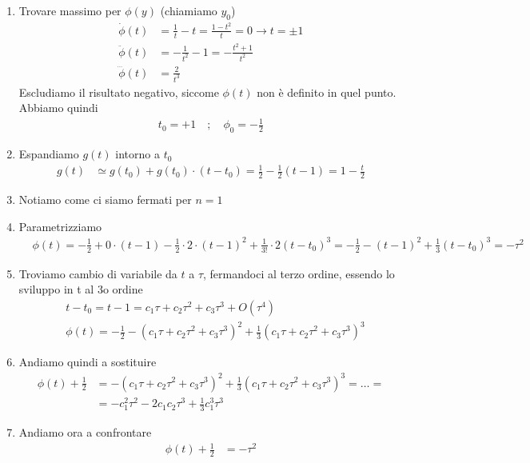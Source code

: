 \begin{enumerate}
	\item Trovare massimo per \(\phi(y)\) (chiamiamo \(y_0\))
	\begin{align}
		\dot{\phi}(t) &=\frac{1}{t} - t = \frac{1- t^2}{t} = 0 \to t = \pm 1\\
		\ddot{\phi}(t) &= -\frac{1}{t^2} - 1 = -\frac{t^2+1}{t^2}  \\
		\dddot{\phi}(t) &= \frac{2}{t^3}
	\end{align}
	Escludiamo il risultato negativo, siccome $\phi(t)$ non è definito in quel punto. Abbiamo quindi
	\begin{align}
		t_0=+1 \quad ; \quad\phi_0 = -\frac{1}{2}
	\end{align}
	\item Espandiamo \(g(t)\) intorno a \(t_0\)
	\begin{align}
		g(t) &\simeq g(t_0) + g(t_0)\cdot(t-t_0) = \frac{1}{2} - \frac{1}{2} (t-1) = 1-\frac{t}{2} 
	\end{align}
	\item Notiamo come ci siamo fermati per \(n=1\)
	\item Parametrizziamo
	\begin{align}
		&\phi(t)= -\frac{1}{2} + 0\cdot(t-1) - \frac{1}{2}\cdot 2 \cdot(t-1)^2  + \frac{1}{3!} \cdot 2 (t-t_0)^3= -\frac{1}{2} - (t-1)^2 + \frac{1}{3} (t-t_0)^3= -\tau^2
	\end{align}
	\item Troviamo cambio di variabile da \(t\) a \(\tau\), fermandoci al terzo ordine, essendo lo sviluppo in t al 3o ordine
	\begin{align}
		&t-t_0 = t-1 = c_1 \tau + c_2 \tau^2 + c_3 \tau^3 + O(\tau^4)\\
		&\phi(t) = - \frac{1}{2} - (c_1 \tau + c_2 \tau^2 + c_3 \tau^3)^2+ \frac{1}{3} (c_1 \tau + c_2 \tau^2 + c_3 \tau^3)^3
	\end{align}
	\item Andiamo quindi a sostituire
	\begin{align}
		\phi(t) + \frac{1}{2} &=  - (c_1 \tau + c_2 \tau^2 + c_3 \tau^3)^2+ \frac{1}{3} (c_1 \tau + c_2 \tau^2 + c_3 \tau^3)^3 = \dots = \nonumber\\
		&= -c_1^2 \tau^2 - 2c_1c_2 \tau^3 + \frac{1}{3}c_1^3 \tau^3
	\end{align}
	\item Andiamo ora a confrontare
	\begin{align}
		\phi(t) + \frac{1}{2} &= -\tau^2\\

\end{align}
\end{enumerate}
